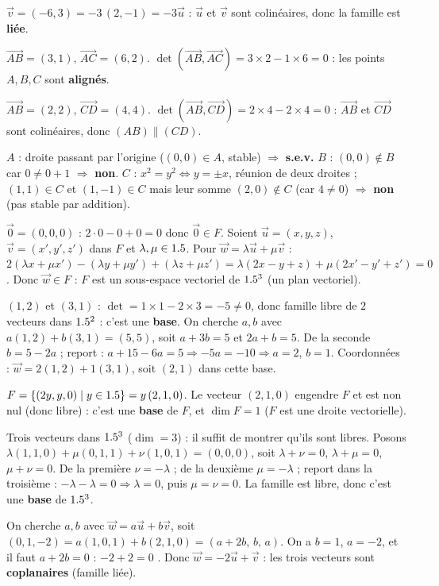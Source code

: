 $\vec v=(-6,3)=-3\,(2,-1)=-3\vec u$ : $\vec u$ et $\vec v$ sont colinéaires, donc la famille est
\textbf{liée}.

$\vec{AB}=(3,1)$, $\vec{AC}=(6,2)$. $\det(\vec{AB},\vec{AC})=3\times2-1\times6=0$ : les points
$A,B,C$ sont \textbf{alignés}.

$\vec{AB}=(2,2)$, $\vec{CD}=(4,4)$. $\det(\vec{AB},\vec{CD})=2\times4-2\times4=0$ : $\vec{AB}$ et
$\vec{CD}$ sont colinéaires, donc $(AB)\parallel(CD)$.

$A$ : droite passant par l'origine ($(0,0)\in A$, stable) $\Rightarrow$ \textbf{s.e.v.}\;
$B$ : $(0,0)\notin B$ car $0\neq0+1$ $\Rightarrow$ \textbf{non}.\;
$C$ : $x^2=y^2\Leftrightarrow y=\pm x$, réunion de deux droites ; $(1,1)\in C$ et $(1,-1)\in C$
mais leur somme $(2,0)\notin C$ (car $4\neq0$) $\Rightarrow$ \textbf{non} (pas stable par addition).

$\vec 0=(0,0,0)$ : $2\cdot0-0+0=0$ donc $\vec 0\in F$. Soient $\vec u=(x,y,z)$, $\vec v=(x',y',z')$
dans $F$ et $\lambda,\mu\in1.5$. Pour $\vec w=\lambda\vec u+\mu\vec v$ :
$2(\lambda x+\mu x')-(\lambda y+\mu y')+(\lambda z+\mu z')=\lambda(2x-y+z)+\mu(2x'-y'+z')=0$.
Donc $\vec w\in F$ : $F$ est un sous-espace vectoriel de $1.5^3$ (un plan vectoriel).

$(1,2)$ et $(3,1)$ : $\det=1\times1-2\times3=-5\neq0$, donc famille libre de $2$ vecteurs dans
$1.5^2$ : c'est une \textbf{base}. On cherche $a,b$ avec $a(1,2)+b(3,1)=(5,5)$, soit $a+3b=5$ et
$2a+b=5$. De la seconde $b=5-2a$ ; report : $a+15-6a=5\Rightarrow-5a=-10\Rightarrow a=2$, $b=1$.
Coordonnées : $\vec w=2(1,2)+1(3,1)$, soit $(2,1)$ dans cette base.

$F=\{(2y,y,0)\mid y\in1.5\}=y\,(2,1,0)$. Le vecteur $(2,1,0)$ engendre $F$ et est non nul (donc
libre) : c'est une \textbf{base} de $F$, et $\dim F=1$ ($F$ est une droite vectorielle).

Trois vecteurs dans $1.5^3$ ($\dim=3$) : il suffit de montrer qu'ils sont libres. Posons
$\lambda(1,1,0)+\mu(0,1,1)+\nu(1,0,1)=(0,0,0)$, soit
$\lambda+\nu=0$, $\lambda+\mu=0$, $\mu+\nu=0$. De la première $\nu=-\lambda$ ; de la deuxième
$\mu=-\lambda$ ; report dans la troisième : $-\lambda-\lambda=0\Rightarrow\lambda=0$, puis
$\mu=\nu=0$. La famille est libre, donc c'est une \textbf{base} de $1.5^3$.

On cherche $a,b$ avec $\vec w=a\vec u+b\vec v$, soit $(0,1,-2)=a(1,0,1)+b(2,1,0)=(a+2b,\,b,\,a)$.
On a $b=1$, $a=-2$, et il faut $a+2b=0$ : $-2+2=0$ \checkmark. Donc $\vec w=-2\vec u+\vec v$ : les
trois vecteurs sont \textbf{coplanaires} (famille liée).


